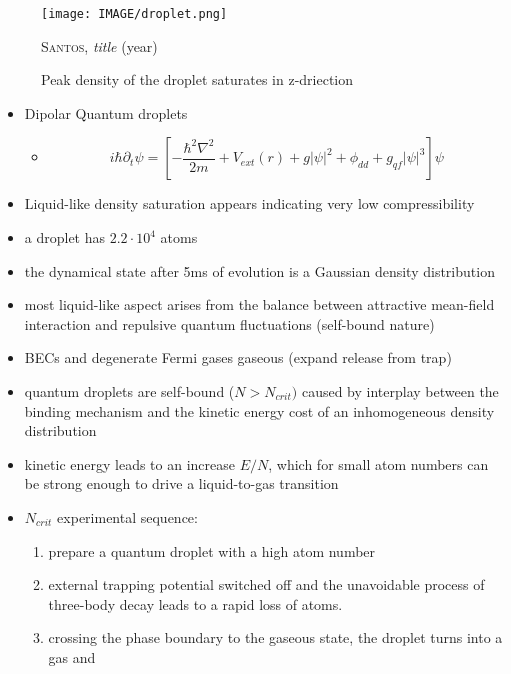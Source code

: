 \begin{figure}[H]
    \centering
    \texttt{[image: IMAGE/droplet.png]}\\
    \caption{Peak density of the droplet saturates in z-driection}
    \textsc{Santos}, \emph{title} (year)
    \label{fig:droplet}
\end{figure}

\begin{itemize}
    \item Dipolar Quantum droplets
    \begin{itemize}
        \item[]
            \begin{equation}
              i \hbar \partial_{t} \psi = \left[ - \frac{\hbar^{2} \nabla^{2}}{2 m} + V_{ext}(r) + g |\psi|^{2} + \phi_{dd} + g_{qf} |\psi|^{3} \right] \psi
            \end{equation}
    \end{itemize}
    \item Liquid-like density saturation appears indicating very low compressibility
    \item a droplet has $2.2 \cdot 10^{4}$ atoms
    \item the dynamical state after 5ms of evolution is a Gaussian density distribution
    \item most liquid-like aspect arises from the balance between attractive
        mean-field interaction and repulsive quantum fluctuations (self-bound nature)
    \item BECs and degenerate Fermi gases gaseous (expand release from trap)
    \item quantum droplets are self-bound ($N > N_{crit})$ caused by interplay between the binding mechanism and the kinetic energy cost of an inhomogeneous density distribution
    \item kinetic energy leads to an increase $E/N$, which for small atom numbers can be strong enough to drive a liquid-to-gas transition
    \item $N_{crit}$ experimental sequence:
        \begin{enumerate}
            \item prepare a quantum droplet with a high atom number
            \item external trapping potential switched off and the unavoidable process of three-body decay leads to a rapid loss of atoms.
            \item crossing the phase boundary to the gaseous state, the droplet turns into a gas and

\end{enumerate}
\end{itemize}
